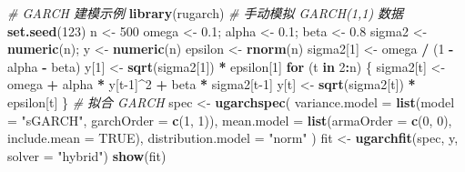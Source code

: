\documentclass[
]{book}
\newenvironment{Shaded}{\begin{snugshade}}{\end{snugshade}}
\newcommand{\AttributeTok}[1]{\textcolor[rgb]{0.13,0.29,0.53}{#1}}
\newcommand{\CommentTok}[1]{\textcolor[rgb]{0.56,0.35,0.01}{\textit{#1}}}
\newcommand{\ConstantTok}[1]{\textcolor[rgb]{0.56,0.35,0.01}{#1}}
\newcommand{\ControlFlowTok}[1]{\textcolor[rgb]{0.13,0.29,0.53}{\textbf{#1}}}
\newcommand{\DecValTok}[1]{\textcolor[rgb]{0.00,0.00,0.81}{#1}}
\newcommand{\FloatTok}[1]{\textcolor[rgb]{0.00,0.00,0.81}{#1}}
\newcommand{\FunctionTok}[1]{\textcolor[rgb]{0.13,0.29,0.53}{\textbf{#1}}}
\newcommand{\NormalTok}[1]{#1}
\newcommand{\OtherTok}[1]{\textcolor[rgb]{0.56,0.35,0.01}{#1}}
\newcommand{\SpecialCharTok}[1]{\textcolor[rgb]{0.81,0.36,0.00}{\textbf{#1}}}
\newcommand{\StringTok}[1]{\textcolor[rgb]{0.31,0.60,0.02}{#1}}
\begin{document}
\begin{Shaded}
\begin{Highlighting}[]
\CommentTok{\# GARCH 建模示例}
\FunctionTok{library}\NormalTok{(rugarch)}
\CommentTok{\# 手动模拟 GARCH(1,1) 数据}
\FunctionTok{set.seed}\NormalTok{(}\DecValTok{123}\NormalTok{)}
\NormalTok{n }\OtherTok{\textless{}{-}} \DecValTok{500}
\NormalTok{omega }\OtherTok{\textless{}{-}} \FloatTok{0.1}\NormalTok{; alpha }\OtherTok{\textless{}{-}} \FloatTok{0.1}\NormalTok{; beta }\OtherTok{\textless{}{-}} \FloatTok{0.8}
\NormalTok{sigma2 }\OtherTok{\textless{}{-}} \FunctionTok{numeric}\NormalTok{(n); y }\OtherTok{\textless{}{-}} \FunctionTok{numeric}\NormalTok{(n)}
\NormalTok{epsilon }\OtherTok{\textless{}{-}} \FunctionTok{rnorm}\NormalTok{(n)}
\NormalTok{sigma2[}\DecValTok{1}\NormalTok{] }\OtherTok{\textless{}{-}}\NormalTok{ omega }\SpecialCharTok{/}\NormalTok{ (}\DecValTok{1} \SpecialCharTok{{-}}\NormalTok{ alpha }\SpecialCharTok{{-}}\NormalTok{ beta)}
\NormalTok{y[}\DecValTok{1}\NormalTok{] }\OtherTok{\textless{}{-}} \FunctionTok{sqrt}\NormalTok{(sigma2[}\DecValTok{1}\NormalTok{]) }\SpecialCharTok{*}\NormalTok{ epsilon[}\DecValTok{1}\NormalTok{]}
\ControlFlowTok{for}\NormalTok{ (t }\ControlFlowTok{in} \DecValTok{2}\SpecialCharTok{:}\NormalTok{n) \{}
\NormalTok{  sigma2[t] }\OtherTok{\textless{}{-}}\NormalTok{ omega }\SpecialCharTok{+}\NormalTok{ alpha }\SpecialCharTok{*}\NormalTok{ y[t}\DecValTok{{-}1}\NormalTok{]}\SpecialCharTok{\^{}}\DecValTok{2} \SpecialCharTok{+}\NormalTok{ beta }\SpecialCharTok{*}\NormalTok{ sigma2[t}\DecValTok{{-}1}\NormalTok{]}
\NormalTok{  y[t] }\OtherTok{\textless{}{-}} \FunctionTok{sqrt}\NormalTok{(sigma2[t]) }\SpecialCharTok{*}\NormalTok{ epsilon[t]}
\NormalTok{\}}
\CommentTok{\# 拟合 GARCH}
\NormalTok{spec }\OtherTok{\textless{}{-}} \FunctionTok{ugarchspec}\NormalTok{(}
  \AttributeTok{variance.model =} \FunctionTok{list}\NormalTok{(}\AttributeTok{model =} \StringTok{"sGARCH"}\NormalTok{, }\AttributeTok{garchOrder =} \FunctionTok{c}\NormalTok{(}\DecValTok{1}\NormalTok{, }\DecValTok{1}\NormalTok{)),}
  \AttributeTok{mean.model =} \FunctionTok{list}\NormalTok{(}\AttributeTok{armaOrder =} \FunctionTok{c}\NormalTok{(}\DecValTok{0}\NormalTok{, }\DecValTok{0}\NormalTok{), }\AttributeTok{include.mean =} \ConstantTok{TRUE}\NormalTok{),}
  \AttributeTok{distribution.model =} \StringTok{"norm"}
\NormalTok{)}
\NormalTok{fit }\OtherTok{\textless{}{-}} \FunctionTok{ugarchfit}\NormalTok{(spec, y, }\AttributeTok{solver =} \StringTok{"hybrid"}\NormalTok{)}
\FunctionTok{show}\NormalTok{(fit)}
\end{Highlighting}
\end{Shaded}
\end{document}
